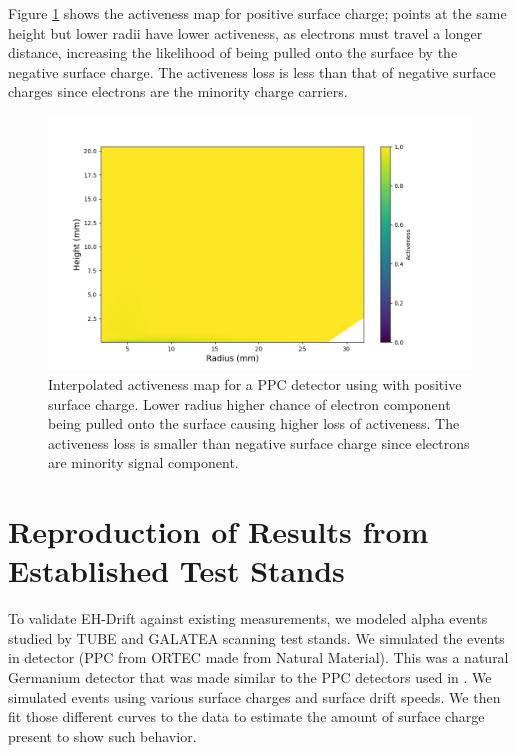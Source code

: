 Figure \ref{ch5_fig_interpolated_activeness_map_pos} shows the activeness map for positive surface charge; points at the same height but lower radii have lower activeness, as electrons must travel a longer distance, increasing the likelihood of being pulled onto the surface by the negative surface charge. The activeness loss is less than that of negative surface charges since electrons are the minority charge carriers.

\begin{figure}%
\includegraphics[trim={1.5cm 0cm 3.3cm 1cm},clip,width=0.9\linewidth]{ch5/figs/activeness_map_cubic_sc=0.3_ponama_1_5000.png}
\caption{Interpolated activeness map for a PPC detector using \ehd with positive surface charge. Lower radius higher chance of electron component being pulled onto the surface causing higher loss of activeness. The activeness loss is smaller than negative surface charge since electrons are minority signal component.}
\label{ch5_fig_interpolated_activeness_map_pos}
\end{figure}


\section{\label{res:1} Reproduction of Results from Established Test Stands}

To validate EH-Drift against existing measurements, we modeled alpha events studied by TUBE and GALATEA scanning test stands. We simulated the events in {\ponama} detector (PPC from ORTEC made from Natural Material). This was a natural Germanium detector that was made similar to the PPC detectors used in {\MJD}. We simulated events using various surface charges and surface drift speeds.  We then fit those different curves to the data to estimate the amount of surface charge present to show such behavior.

